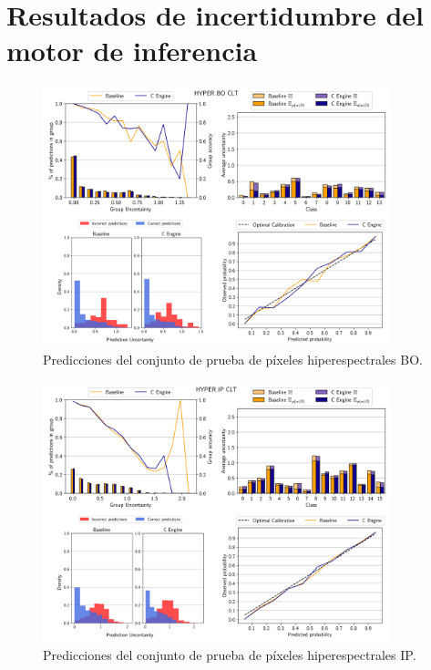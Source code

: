 \chapter{Resultados de incertidumbre del motor de inferencia} \label{anx:motor}

\begin{figure}[ht]
    \centering
    \includegraphics[width=0.9\textwidth]{root/Imagenes/anexo/CLT-HYPER_BO-mosaic.png}
    \caption{Predicciones del conjunto de prueba de píxeles hiperespectrales BO.}
    \label{fig:anx-CLT-HYPER_BO}
\end{figure}


\begin{figure}[ht]
    \centering
    \includegraphics[width=0.9\textwidth]{root/Imagenes/anexo/CLT-HYPER_IP-mosaic.png}
    \caption{Predicciones del conjunto de prueba de píxeles hiperespectrales IP.}
    \label{fig:anx-CLT-HYPER_IP}
\end{figure}


